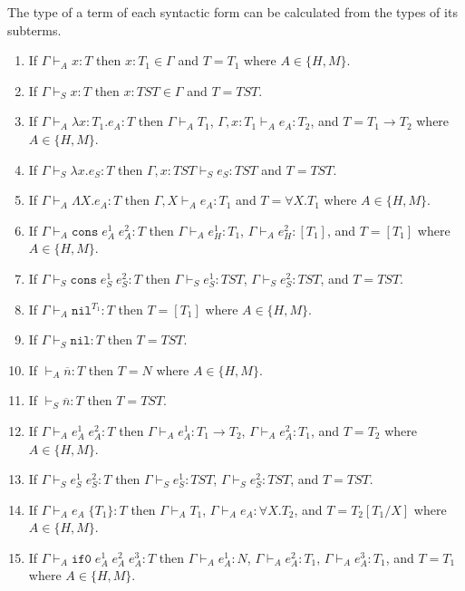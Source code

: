\begin{lemma}
\label{i}
\onehalfspacing
The type of a term of each syntactic form can be calculated from the types of its subterms.
\begin{enumerate}
\item If $\Gamma\vdash_{A}x:T$ then $x:T_{1}\in\Gamma$ and $T=T_{1}$ where $A\in\lbrace H,M\rbrace$.
\item If $\Gamma\vdash_{S}x:T$ then $x:TST\in\Gamma$ and $T=TST$.
\item If $\Gamma\vdash_{A}\lambda x:T_{1}.e_{A}:T$ then $\Gamma\vdash_{A}T_{1}$, $\Gamma,x:T_{1}\vdash_{A}e_{A}:T_{2}$, and $T=T_{1}\rightarrow T_{2}$ where $A\in\lbrace H,M\rbrace$.
\item If $\Gamma\vdash_{S}\lambda x.e_{S}:T$ then $\Gamma,x:TST\vdash_{S}e_{S}:TST$ and $T=TST$.
\item If $\Gamma\vdash_{A}\Lambda X.e_{A}:T$ then $\Gamma,X\vdash_{A}e_{A}:T_{1}$ and $T=\forall X.T_{1}$ where $A\in\lbrace H,M\rbrace$.
\item If $\Gamma\vdash_{A}\mathtt{cons}\;e_{A}^{1}\;e_{A}^{2}:T$ then $\Gamma\vdash_{A}e_{H}^{1}:T_{1}$, $\Gamma\vdash_{A}e_{H}^{2}:[T_{1}]$, and $T=[T_{1}]$ where $A\in\lbrace H,M\rbrace$.
\item If $\Gamma\vdash_{S}\mathtt{cons}\;e_{S}^{1}\;e_{S}^{2}:T$ then $\Gamma\vdash_{S}e_{S}^{1}:TST$, $\Gamma\vdash_{S}e_{S}^{2}:TST$, and $T=TST$.
\item If $\Gamma\vdash_{A}\mathtt{nil}^{T_{1}}:T$ then $T=[T_{1}]$ where $A\in\lbrace H,M\rbrace$.
\item If $\Gamma\vdash_{S}\mathtt{nil}:T$ then $T=TST$.
\item If $\vdash_{A}\overline{n}:T$ then $T=N$ where $A\in\lbrace H,M\rbrace$.
\item If $\vdash_{S}\overline{n}:T$ then $T=TST$.
\item If $\Gamma\vdash_{A}e_{A}^{1}\;e_{A}^{2}:T$ then $\Gamma\vdash_{A}e_{A}^{1}:T_{1}\rightarrow T_{2}$, $\Gamma\vdash_{A}e_{A}^{2}:T_{1}$, and $T=T_{2}$ where $A\in\lbrace H,M\rbrace$.
\item If $\Gamma\vdash_{S}e_{S}^{1}\;e_{S}^{2}:T$ then $\Gamma\vdash_{S}e_{S}^{1}:TST$, $\Gamma\vdash_{S}e_{S}^{2}:TST$, and $T=TST$.
\item If $\Gamma\vdash_{A}e_{A}\;\lbrace T_{1}\rbrace:T$ then $\Gamma\vdash_{A}T_{1}$, $\Gamma\vdash_{A}e_{A}:\forall X.T_{2}$, and $T=T_{2}[T_{1}/X]$ where $A\in\lbrace H,M\rbrace$.
\item If $\Gamma\vdash_{A}\mathtt{if0}\;e_{A}^{1}\;e_{A}^{2}\;e_{A}^{3}:T$ then $\Gamma\vdash_{A}e_{A}^{1}:N$, $\Gamma\vdash_{A}e_{A}^{2}:T_{1}$, $\Gamma\vdash_{A}e_{A}^{3}:T_{1}$, and $T=T_{1}$ where $A\in\lbrace H,M\rbrace$.

\end{enumerate}
\end{lemma}
